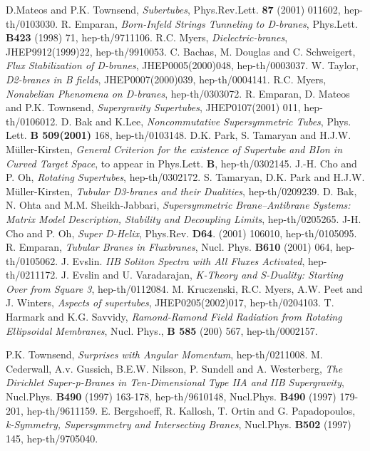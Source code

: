 \documentclass[a4paper,12pt]{article}
\begin{document}
\begin{thebibliography}{99}


D.Mateos and P.K. Townsend, {\it Subertubes}, Phys.Rev.Lett. 
{\bf 87} (2001) 011602, hep-th/0103030.
R. Emparan, {\it Born-Infeld Strings Tunneling to D-branes}, 
Phys.Lett. {\bf B423} (1998) 71, hep-th/9711106.
R.C. Myers, {\it Dielectric-branes}, JHEP9912(1999)22, hep-th/9910053.
C. Bachas, M. Douglas and C. Schweigert, {\it Flux Stabilization of D-branes}, JHEP0005(2000)048, hep-th/0003037.
W. Taylor, {\it D2-branes in B fields}, JHEP0007(2000)039, hep-th/0004141.
R.C. Myers, {\it Nonabelian Phenomena on D-branes}, hep-th/0303072.
R. Emparan, D. Mateos and P.K. Townsend, {\it Supergravity Supertubes}, JHEP0107(2001) 011, hep-th/0106012.
D. Bak and K.Lee, {\it Noncommutative Supersymmetric Tubes}, Phys. Lett. {\bf B 509(2001)} 168, hep-th/0103148.
D.K. Park, S. Tamaryan and H.J.W. M\"uller-Kirsten, {\it General Criterion for the existence of Supertube and BIon in Curved Target Space}, to appear in Phys.Lett. {\bf B}, hep-th/0302145.
J.-H. Cho and P. Oh, {\it Rotating Supertubes}, hep-th/0302172.
S. Tamaryan, D.K. Park and H.J.W. M\"uller-Kirsten, {\it Tubular D3-branes and their Dualities}, hep-th/0209239.
D. Bak, N. Ohta and M.M. Sheikh-Jabbari, {\it Supersymmetric Brane--Antibrane Systems: Matrix Model Description, Stability and Decoupling Limits}, hep-th/0205265.
J-H. Cho and P. Oh, {\it Super D-Helix}, Phys.Rev. {\bf D64}. 
(2001) 106010, hep-th/0105095.
R. Emparan, {\it Tubular Branes in Fluxbranes}, Nucl. Phys. {\bf B610} (2001) 064, hep-th/0105062.
J. Evslin. {\it IIB Soliton Spectra with All Fluxes Activated}, hep-th/0211172.
J. Evslin and U. Varadarajan, {\it K-Theory and S-Duality: Starting Over from Square 3}, hep-th/0112084.
M. Kruczenski, R.C. Myers, A.W. Peet and J. Winters, {\it Aspects of supertubes}, JHEP0205(2002)017, hep-th/0204103.
T. Harmark and K.G. Savvidy, {\it Ramond-Ramond Field Radiation from Rotating Ellipsoidal Membranes}, Nucl. Phys., {\bf B 585} (200) 567, hep-th/0002157.

P.K. Townsend, {\it Surprises with Angular Momentum}, 
hep-th/0211008. 
M. Cederwall, A.v. Gussich, B.E.W. Nilsson, P. Sundell and A. Westerberg, {\it The Dirichlet Super-p-Branes in Ten-Dimensional Type IIA and IIB Supergravity}, Nucl.Phys. {\bf B490} (1997) 163-178, hep-th/9610148, Nucl.Phys. {\bf B490} (1997) 179-201, hep-th/9611159.
E. Bergshoeff, R. Kallosh, T. Ortin and G. Papadopoulos, {\it k-Symmetry, Supersymmetry and Intersecting Branes},  Nucl.Phys. {\bf B502} (1997) 145, hep-th/9705040.





\end{thebibliography}
\end{document}
